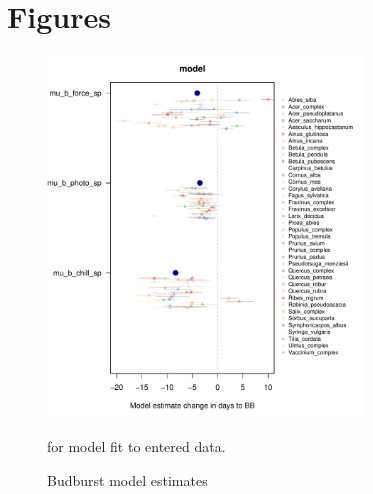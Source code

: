 \documentclass[11pt,letter]{article}
\begin{document}
\section* {Figures}

\newpage

\begin{figure}[h!]
\centering
\noindent \includegraphics[width=0.75\textwidth]{..//..//analyses/bb_analysis/figures/muplotmodelspcomwcrops_expramp_fpz.pdf}
\caption{Budburst model estimates} for model fit to entered data. 
\label{fig:mu}
\end{figure}
\end{document}
